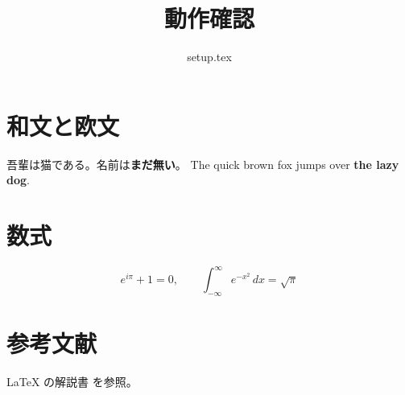 \documentclass[a4paper]{jarticle}
\title{動作確認}
\author{setup.tex}
\date{}
\begin{document}
\maketitle

\section{和文と欧文}
吾輩は猫である。名前は\textbf{まだ無い}。
The quick brown fox jumps over \textbf{the lazy dog}.

\section{数式}
\begin{equation}
  e^{i\pi} + 1 = 0, \qquad
  \int_{-\infty}^{\infty} e^{-x^2}\,dx = \sqrt{\pi}
\end{equation}

\section{参考文献}
\LaTeX{} の解説書 \cite{lamport} を参照。



\end{document}
